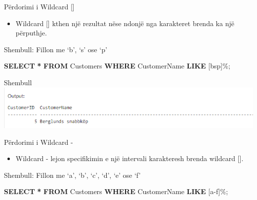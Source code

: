 \documentclass[
  ignorenonframetext,
]{beamer}
\newenvironment{Shaded}{\begin{snugshade}}{\end{snugshade}}
\newcommand{\KeywordTok}[1]{\textcolor[rgb]{0.13,0.29,0.53}{\textbf{#1}}}
\newcommand{\NormalTok}[1]{#1}
\newcommand{\OperatorTok}[1]{\textcolor[rgb]{0.81,0.36,0.00}{\textbf{#1}}}
\newcommand{\StringTok}[1]{\textcolor[rgb]{0.31,0.60,0.02}{#1}}
\providecommand{\tightlist}{%
  \setlength{\itemsep}{0pt}\setlength{\parskip}{0pt}}
\begin{document}
\begin{frame}{Përdorimi i Wildcard {[}{]}}
\label{puxebrdorimi-i-wildcard}
\begin{itemize}
\tightlist
\item
  Wildcard {[}{]} kthen një rezultat nëse ndonjë nga karakteret brenda
  ka një përputhje.
\end{itemize}
\end{frame}

\begin{frame}[fragile]{Shembull: Fillon me `b', `s' ose `p'}
\label{shembull-fillon-me-b-s-ose-p}
\begin{Shaded}
\begin{Highlighting}[]
\KeywordTok{SELECT} \OperatorTok{*}
\KeywordTok{FROM}\NormalTok{ Customers}
\KeywordTok{WHERE}\NormalTok{ CustomerName }\KeywordTok{LIKE} \StringTok{\textquotesingle{}[bsp]\%\textquotesingle{}}\NormalTok{;}
\end{Highlighting}
\end{Shaded}
\end{frame}

\begin{frame}{Shembull}
\label{shembull-16}
\includegraphics{./Figs/query71.png}
\end{frame}

\begin{frame}{Përdorimi i Wildcard -}
\label{puxebrdorimi-i-wildcard--}
\begin{itemize}
\tightlist
\item
  Wildcard - lejon specifikimin e një intervali karakteresh brenda
  wildcard {[}{]}.
\end{itemize}
\end{frame}

\begin{frame}[fragile]{Shembull: Fillon me `a', `b', `c', `d', `e' ose
`f'}
\label{shembull-fillon-me-a-b-c-d-e-ose-f}
\begin{Shaded}
\begin{Highlighting}[]
\KeywordTok{SELECT} \OperatorTok{*}
\KeywordTok{FROM}\NormalTok{ Customers}
\KeywordTok{WHERE}\NormalTok{ CustomerName }\KeywordTok{LIKE} \StringTok{\textquotesingle{}[a{-}f]\%\textquotesingle{}}\NormalTok{;}
\end{Highlighting}
\end{Shaded}
\end{frame}
\end{document}
